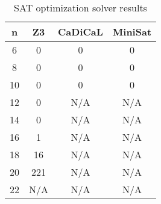 \begin{table}[H]
\centering
\small
{%
\begin{tabular}{|c|c|c|c|}
\toprule
\textbf{n} & \textbf{Z3} &\textbf{CaDiCaL} & \textbf{MiniSat} \\
\midrule
6  & 0   & 0   & 0   \\
8  & 0   & 0   & 0   \\
10 & 0   & 0   & 0   \\
12 & 0   & N/A & N/A \\
14 & 0   & N/A & N/A \\
16 & 1   & N/A & N/A \\
18 & 16  & N/A & N/A \\
20 & 221 & N/A & N/A \\
22 & N/A & N/A & N/A \\
\bottomrule
\end{tabular}
}
\caption{SAT optimization solver results}
\label{table:mip-results}
\end{table}

